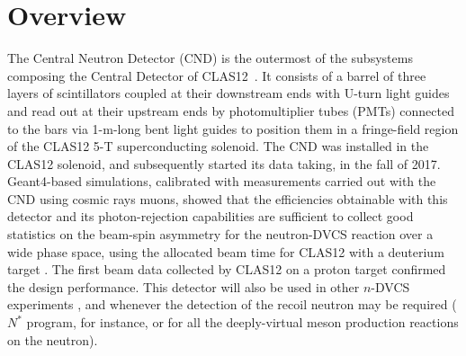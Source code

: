 \section{Overview}

The Central Neutron Detector (CND) is the outermost of the subsystems composing the Central Detector of CLAS12~\cite{clas12-nim}. It consists of a barrel of three layers of scintillators coupled at their downstream ends with U-turn light guides and read out at their upstream ends by photomultiplier tubes (PMTs) connected to the bars via 1-m-long bent light guides to position them in a fringe-field region of the CLAS12 5-T superconducting solenoid. The CND was installed in the CLAS12 solenoid, and subsequently started its data taking, in the fall of 2017. 
Geant4-based simulations, calibrated with measurements carried out with the CND using cosmic rays muons, showed that the efficiencies obtainable with this detector and its photon-rejection capabilities are sufficient to collect good statistics on the beam-spin asymmetry for the neutron-DVCS reaction over a wide phase space, using the allocated beam time for CLAS12 with a deuterium target \cite{Jlab12_CLAS_n}. The first beam data collected by CLAS12 on a proton target confirmed the design performance. This detector will also be used in other $n$-DVCS experiments \cite{Jlab12_CLAS_n_pol}, and whenever the detection of the recoil neutron may be required ($N^*$ program, for instance, or for all the deeply-virtual meson production reactions on the neutron).



